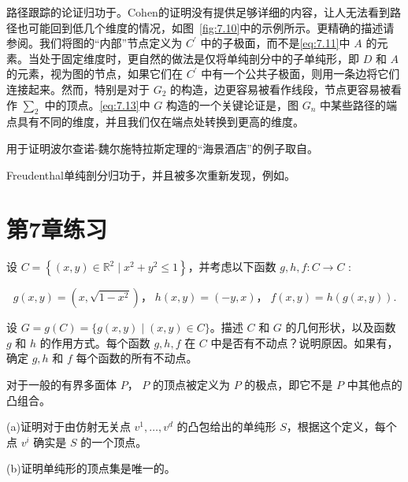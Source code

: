 路径跟踪的论证归功于\citet{cohen1967}。Cohen的证明没有提供足够详细的内容，让人无法看到路径也可能回到低几个维度的情况，如图~\ref{fig:7.10}中的示例所示。更精确的描述请参阅\citet{kuhn1969}。我们将图的“内部”节点定义为 \({C}^{\prime }\) 中的子极面，而不是\eqref{eq:7.11}中 \(A\) 的元素。当处于固定维度时，更自然的做法是仅将单纯剖分中的子单纯形，即 \(D\) 和 \(A\) 的元素，视为图的节点，如果它们在 \({C}^{\prime }\) 中有一个公共子极面，则用一条边将它们连接起来。然而，特别是对于 \({G}_{2}\) 的构造，边更容易被看作线段，节点更容易被看作 \({\sum }_{2}\) 中的顶点。\eqref{eq:7.13}中 \(G\) 构造的一个关键论证是，图 \({G}_{n}\) 中某些路径的端点具有不同的维度，并且我们仅在端点处转换到更高的维度。

用于证明波尔查诺-魏尔施特拉斯定理的“海景酒店”的例子取自\citet{bryant1990}。

Freudenthal单纯剖分归功于\citet{freudenthal1942}，并且被多次重新发现，例如\citet{kuhn1960}。

\section{第7章练习}\label{sec-7.9}

\bigskip
\noindent
\begin{exercise}\label{exer:7.1}
设 \(C = \left\{  {\left( {x,y}\right)  \in  {\mathbb{R}}^{2} \mid  {x}^{2} + {y}^{2} \leq  1}\right\}\)，并考虑以下函数 \(g,h,f : C \rightarrow  C\) :

\[
g\left( {x,y}\right)  = \left( {x,\sqrt{1 - {x}^{2}}}\right)，\;h\left( {x,y}\right)  = \left( {-y,x}\right)，\;f\left( {x,y}\right)  = h\left( {g\left( {x,y}\right) }\right) .
\]

设 \(G = g\left( C\right)  = \{ g\left( {x,y}\right)  \mid  \left( {x,y}\right)  \in  C\}\)。描述 \(C\) 和 \(G\) 的几何形状，以及函数 \(g\) 和 \(h\) 的作用方式。每个函数 \(g,h,f\) 在 \(C\) 中是否有不动点？说明原因。如果有，确定 \(g,h\) 和 \(f\) 每个函数的所有不动点。
\end{exercise}

\bigskip
\noindent
\begin{exercise}\label{exer:7.2}
对于一般的有界多面体 \(P\)， \(P\) 的顶点被定义为 \(P\) 的极点，即它不是 \(P\) 中其他点的凸组合。

(a)证明对于由仿射无关点 \({v}^{1},\ldots,{v}^{d}\) 的凸包给出的单纯形 \(S\)，根据这个定义，每个点 \({v}^{i}\) 确实是 \(S\) 的一个顶点。

(b)证明单纯形的顶点集是唯一的。
\end{exercise}

